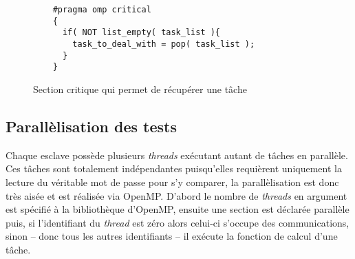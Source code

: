\begin{figure}
\begin{lstlisting}
	#pragma omp critical
	{
	  if( NOT list_empty( task_list ){
	    task_to_deal_with = pop( task_list );
	  }
	}
\end{lstlisting}
\caption{Section critique qui permet de récupérer une tâche}
\label{critical}
\end{figure}

\subsection{Parallèlisation des tests}

Chaque esclave possède plusieurs \emph{threads} exécutant autant de tâches en parallèle. Ces tâches sont totalement indépendantes puisqu'elles requièrent uniquement la lecture du véritable mot de passe pour s'y comparer, la parallèlisation est donc très aisée et est réalisée via \textsf{OpenMP}. D'abord le nombre de \emph{threads} en argument est spécifié à la bibliothèque d'\textsf{OpenMP}, ensuite une section est déclarée parallèle puis, si l'identifiant du \emph{thread} est zéro alors celui-ci s'occupe des communications, sinon -- donc tous les autres identifiants -- il exécute la fonction de calcul d'une tâche.

